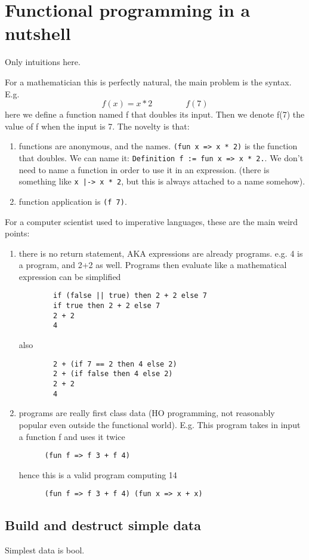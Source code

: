 \section{Functional programming in a nutshell}
Only intuitions here.

For a mathematician this is perfectly natural, the main problem is the syntax.  E.g.
$$f(x) = x * 2\qquad\qquad f(7)$$
here we define a function named f that doubles its input.  Then we denote f(7) the value of f
when the input is 7. The novelty is that:
\begin{enumerate}
\item functions are anonymous, and the names. \verb+(fun x => x * 2)+ is the function that
	doubles.  We can name it: \verb+Definition f := fun x => x * 2.+.  We don't need to
	name a function in order to use it in an expression. (there is something like
	\verb+x |-> x * 2+, but this is always attached to a name somehow).
\item function application is \verb+(f 7)+.
\end{enumerate}

For a computer scientist used to imperative languages, these are the main weird points:
\begin{enumerate}
\item there is no return statement, AKA expressions are already programs.  e.g.
	4 is a program, and 2+2 as well.  Programs then evaluate like a mathematical expression
	can be simplified
\begin{verbatim}
        if (false || true) then 2 + 2 else 7
        if true then 2 + 2 else 7
        2 + 2
        4
\end{verbatim}
also
\begin{verbatim}
        2 + (if 7 == 2 then 4 else 2)
        2 + (if false then 4 else 2)
        2 + 2
        4
\end{verbatim}
\item programs are really first class data (HO programming, not reasonably popular even outside
	the functional world). E.g.
    This program takes in input a function f and uses it twice
\begin{verbatim}
      (fun f => f 3 + f 4)
\end{verbatim}
hence this is a valid program computing 14
\begin{verbatim}
      (fun f => f 3 + f 4) (fun x => x + x)
\end{verbatim}
\end{enumerate}


\subsection{Build and destruct simple data}
Simplest data is bool.

